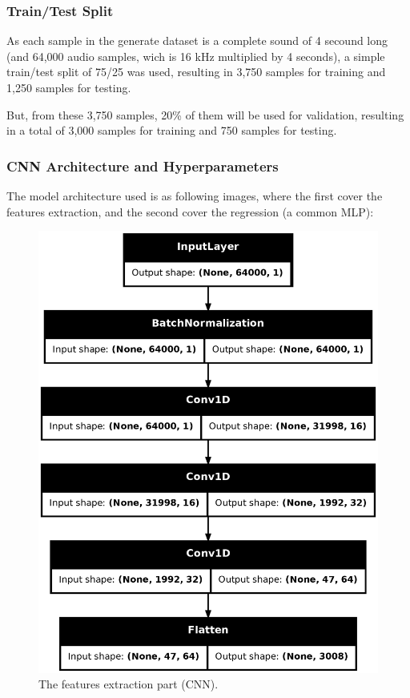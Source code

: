 \documentclass[sigconf,natbib=false]{acmart}
\begin{document}
\subsubsection{Train/Test Split}

As each sample in the generate dataset is a complete sound of 4 secound long (and 64,000 audio samples, wich is 16 kHz multiplied by 4 seconds), a simple train/test split of 75/25 was used, resulting in 3,750 samples for training and 1,250 samples for testing.

But, from these 3,750 samples, 20\% of them will be used for validation, resulting in a total of 3,000 samples for training and 750 samples for testing.

\subsubsection{CNN Architecture and Hyperparameters}

The model architecture used is as following images, where the first cover the features extraction, and the second cover the regression (a common MLP):

\begin{figure}[h]
 \centering
 \includegraphics[width=0.8\linewidth]{figs/projecao.png}
 \caption{The features extraction part (CNN).}
\end{figure}
\end{document}
